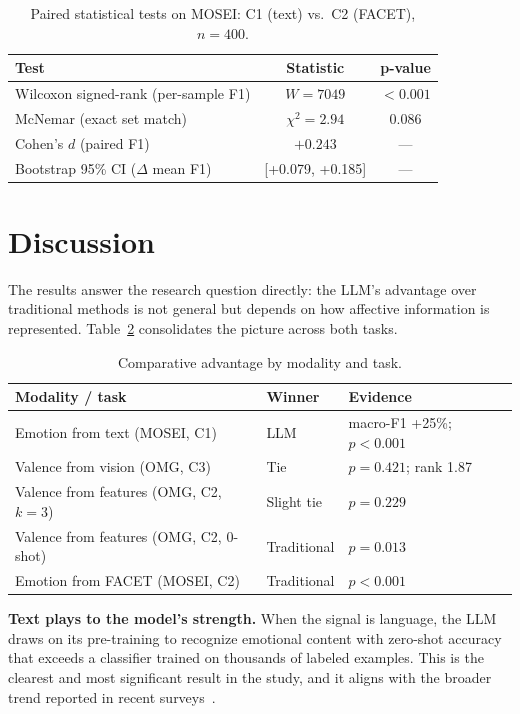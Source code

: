 \documentclass[conference]{IEEEtran}
\begin{document}
\begin{table}[htbp]
\caption{Paired statistical tests on MOSEI: C1 (text) vs.\ C2 (FACET), $n=400$.}
\label{tab:mosei_stats}
\centering
\setlength{\tabcolsep}{4pt}
\renewcommand{\arraystretch}{1.15}
\small
\begin{tabular}{l c c}
\hline
\textbf{Test} & \textbf{Statistic} & \textbf{p-value} \\
\hline
Wilcoxon signed-rank (per-sample F1) & $W=7049$ & \textbf{$<0.001$} \\
McNemar (exact set match) & $\chi^2=2.94$ & 0.086 \\
Cohen's $d$ (paired F1) & $+0.243$ & --- \\
Bootstrap 95\% CI ($\Delta$ mean F1) & [+0.079, +0.185] & --- \\
\hline
\end{tabular}
\end{table}

\section{Discussion}
\label{sec:discussion}
The results answer the research question directly: the LLM's advantage over traditional methods is not general but depends on how affective information is represented. Table~\ref{tab:summary} consolidates the picture across both tasks.

\begin{table}[htbp]
\caption{Comparative advantage by modality and task.}
\label{tab:summary}
\centering
\setlength{\tabcolsep}{4pt}
\renewcommand{\arraystretch}{1.15}
\small
\begin{tabular}{p{3.4cm} l p{2.4cm}}
\hline
\textbf{Modality / task} & \textbf{Winner} & \textbf{Evidence} \\
\hline
Emotion from text (MOSEI, C1) & LLM & macro-F1 +25\%; $p<0.001$ \\
Valence from vision (OMG, C3) & Tie & $p=0.421$; rank 1.87 \\
Valence from features (OMG, C2, $k{=}3$) & Slight tie & $p=0.229$ \\
Valence from features (OMG, C2, 0-shot) & Traditional & $p=0.013$ \\
Emotion from FACET (MOSEI, C2) & Traditional & $p<0.001$ \\
\hline
\end{tabular}
\end{table}

\textbf{Text plays to the model's strength.} When the signal is language, the LLM draws on its pre-training to recognize emotional content with zero-shot accuracy that exceeds a classifier trained on thousands of labeled examples. This is the clearest and most significant result in the study, and it aligns with the broader trend reported in recent surveys~\cite{Survey2024AffectiveLLM, Survey2025MLLMEmotion}.
\end{document}
